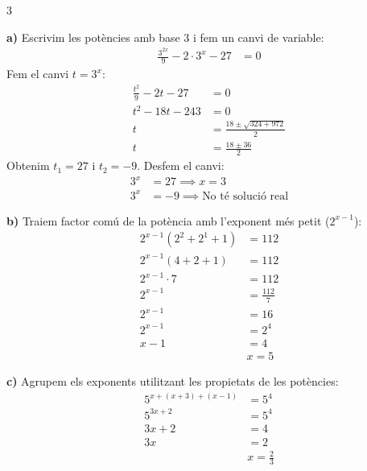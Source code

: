 \documentclass[12pt,a4paper]{exam}
\begin{document}
\begin{questions}
\begin{multicols}{3}
\end{multicols}
\begin{solution}
    \textbf{a)} Escrivim les potències amb base 3 i fem un canvi de variable:
    \begin{align*}
        \frac{3^{2x}}{9} - 2\cdot 3^x - 27 &= 0
    \end{align*}
    Fem el canvi $t = 3^x$:
    \begin{align*}
        \frac{t^2}{9} - 2t - 27 &= 0 \\
        t^2 - 18t - 243 &= 0 \\
        t &= \frac{18 \pm \sqrt{324 + 972}}{2} \\
        t &= \frac{18 \pm 36}{2}
    \end{align*}
    Obtenim $t_1 = 27$ i $t_2 = -9$. Desfem el canvi:
    \begin{align*}
        3^x &= 27 \implies \boxed{x = 3} \\
        3^x &= -9 \implies \text{No té solució real}
    \end{align*}
    
    \textbf{b)} Traiem factor comú de la potència amb l'exponent més petit ($2^{x-1}$):
    \begin{align*}
        2^{x-1} \left(2^2 + 2^1 + 1\right) &= 112 \\
        2^{x-1} (4 + 2 + 1) &= 112 \\
        2^{x-1} \cdot 7 &= 112 \\
        2^{x-1} &= \frac{112}{7} \\
        2^{x-1} &= 16 \\
        2^{x-1} &= 2^4 \\
        x - 1 &= 4 \\
        &\boxed{x = 5}
    \end{align*}
    
    \textbf{c)} Agrupem els exponents utilitzant les propietats de les potències:
    \begin{align*}
        5^{x + (x+3) + (x-1)} &= 5^4 \\
        5^{3x+2} &= 5^4 \\
        3x + 2 &= 4 \\
        3x &= 2 \\
        &\boxed{x = \frac{2}{3}}
    \end{align*}
\end{solution}


\end{questions}
\end{document}
